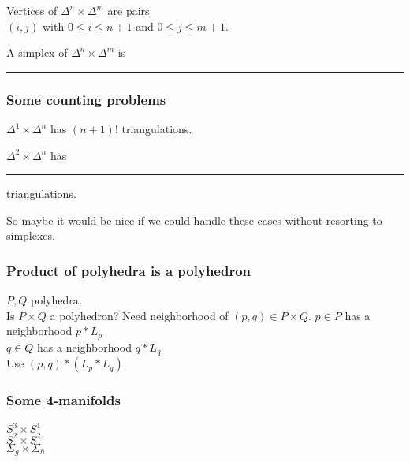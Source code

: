 \documentclass[14pt]{beamer}
\newcommand{\join}{\ast}
\begin{document}


\begin{frame}

  Vertices of $\Delta^n \times \Delta^m$ are pairs \\
  $(i,j)$ with $0 \leq i \leq n+1$ and $0 \leq j \leq m+1$.

  \pause
  \vfill
  A simplex of $\Delta^n \times \Delta^m$ is \rule{48pt}{12pt}

\end{frame}

\begin{frame}
  \frametitle{Some counting problems}

  \vfill

  $\Delta^1 \times \Delta^n$ has $(n+1)!$ triangulations. \\

  \vfill\pause

  $\Delta^2 \times \Delta^n$ has \rule{48pt}{12pt} triangulations.

  \vfill\pause

  So maybe it would be nice if we could handle these cases without
  resorting to simplexes.
  
\end{frame}

\begin{frame}
  \frametitle{Product of polyhedra is a polyhedron}

  $P, Q$ polyhedra. \\
  Is $P \times Q$ a polyhedron?
  \vfill\pause
  Need neighborhood of $(p,q) \in P \times Q$.
  \vfill\pause
  $p \in P$ has a neighborhood $p \join L_p$ \\
  $q \in Q$ has a neighborhood $q \join L_q$ \\
  \vfill\pause
  Use $(p,q) \join (L_p \join L_q)$.

\end{frame}


% 

\begin{frame}
  \frametitle{Some 4-manifolds}
  \Huge
  \vfill
  \begin{center}\pause
  $S^3 \times S^1$\\\pause
  $S^2 \times S^2$\\\pause
  $\Sigma_g \times \Sigma_h$
  \end{center}
  \vfill

\end{frame}
\end{document}
